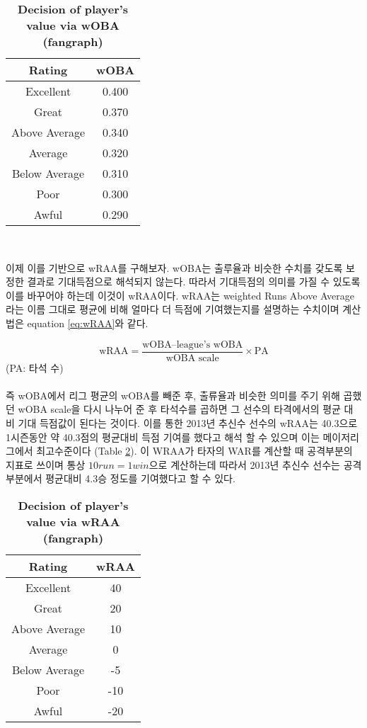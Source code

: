 \documentclass[11pt]{article}
\begin{document}
\begin{table}
\centering
\begin{tabular}{|c|c|}
\hline
Rating & wOBA \\ \hline
Excellent &	0.400\\
Great &	0.370\\
Above Average	& 0.340\\
Average &	0.320\\
Below Average	 & 0.310\\
Poor &	0.300\\
Awful &	0.290\\ \hline
\end{tabular}\\
\caption{\bf{Decision of player's value via wOBA (fangraph)}}
\label{tb3}
\end{table}

이제 이를 기반으로 wRAA를 구해보자. wOBA는 출루율과 비슷한 수치를 갖도록 보정한 결과로 기대득점으로 해석되지 않는다. 따라서 기대득점의 의미를 가질 수 있도록 이를 바꾸어야 하는데 이것이 wRAA이다. wRAA는 weighted Runs Above Average 라는 이름 그대로 평균에 비해 얼마다 더 득점에 기여했는지를 설명하는 수치이며 계산법은 equation \ref{eq:wRAA}와 같다.

\begin{equation}
\label{eq:wRAA}
\text{wRAA} = \frac{\text{wOBA} – \text{league's wOBA}}{\text{wOBA scale}} \times \text{PA}
\end{equation}
(PA: 타석 수)\\\\

즉  wOBA에서 리그 평균의 wOBA를 빼준 후, 출류율과 비슷한 의미를 주기 위해 곱했던 wOBA scale을 다시 나누어 준 후 타석수를 곱하면 그 선수의 타격에서의 평균 대비 기대 득점값이 된다는 것이다. 이를 통한 2013년 추신수 선수의 wRAA는 40.3으로 1시즌동안 약 40.3점의 평균대비 득점 기여를 했다고 해석 할 수 있으며 이는 메이저리그에서 최고수준이다 (Table \ref{tb4}). 이 WRAA가 타자의 WAR를 계산할 때 공격부분의 지표로 쓰이며 통상 $10 run = 1 win $으로 계산하는데 따라서 2013년 추신수 선수는 공격부분에서 평균대비 4.3승 정도를 기여했다고 할 수 있다.

\begin{table}
\centering
\begin{tabular}{|c|c|}
\hline
Rating & wRAA \\ \hline
Excellent	&40\\
Great	&20\\
Above Average&	10\\
Average	&0 \\
Below Average	&-5\\
Poor	&-10\\
Awful	&-20\\ \hline
\end{tabular}\\
\caption{\bf{Decision of player's value via wRAA (fangraph)}}
\label{tb4}
\end{table}
\end{document}
